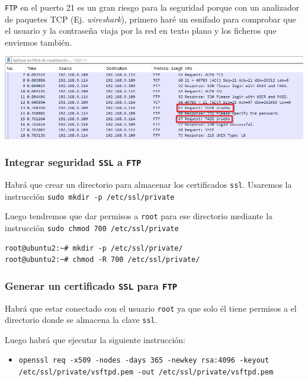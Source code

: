 \documentclass[11pt]{article}
\begin{document}
\texttt{FTP} en el puerto 21 es un gran riesgo para la seguridad porque con un analizador de paquetes TCP (Ej. \emph{wireshark}), primero haré un esnifado para comprobar que el usuario y la contraseña
viaja por la red en texto plano y los ficheros que enviemos también.

\begin{center}
\includegraphics[width=.9\linewidth]{./media/ftp-4.png}
\end{center}

\subsubsection{Integrar seguridad \texttt{SSL} a \texttt{FTP}}
\label{sec:org18ccc30}
Habrá que crear un directorio para almacenar los certificados \texttt{ssl}. Usaremos la instrucción \texttt{sudo mkdir -p /etc/ssl/private}

Luego tendremos que dar permisos a \texttt{root} para ese directorio mediante la instrucción \texttt{sudo chmod 700 /etc/ssl/private}
\begin{verbatim}
root@ubuntu2:~# mkdir -p /etc/ssl/private/
root@ubuntu2:~# chmod -R 700 /etc/ssl/private/
\end{verbatim}

\subsubsection{Generar un certificado \texttt{SSL} para \texttt{FTP}}
\label{sec:org087fa4d}
Habrá que estar conectado con el usuario \texttt{root} ya que solo él tiene permisos a el directorio donde se almacena la clave \texttt{ssl}.

Luego habrá que ejecutar la siguiente instrucción:
\begin{itemize}
\item \texttt{openssl req -x509 -nodes -days 365 -newkey rsa:4096 -keyout /etc/ssl/private/vsftpd.pem -out /etc/ssl/private/vsftpd.pem}
\end{itemize}
\end{document}

